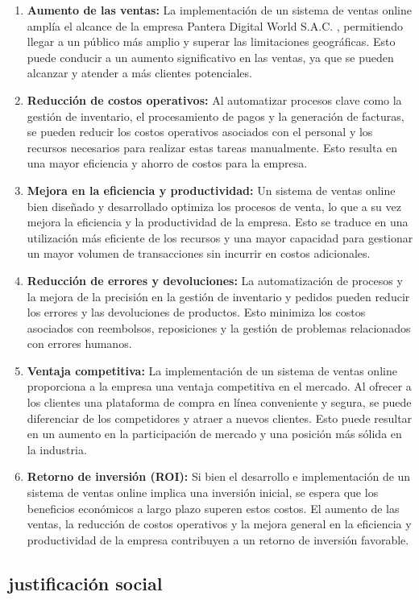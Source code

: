 \documentclass[12pt,a4paper]{article}
\newcommand{\newsubsection}[1]{\subsection{\hspace{5mm} #1}}
\newcommand{\empresa}{Pantera Digital World S.A.C. }
\begin{document}
\begin{enumerate}
\item \textbf{Aumento de las ventas:} La implementación de un sistema de ventas online amplía el alcance de la empresa \empresa, permitiendo llegar a un público más amplio y superar las limitaciones geográficas. Esto puede conducir a un aumento significativo en las ventas, ya que se pueden alcanzar y atender a más clientes potenciales.
\item \textbf{Reducción de costos operativos:} Al automatizar procesos clave como la gestión de inventario, el procesamiento de pagos y la generación de facturas, se pueden reducir los costos operativos asociados con el personal y los recursos necesarios para realizar estas tareas manualmente. Esto resulta en una mayor eficiencia y ahorro de costos para la empresa.
\item \textbf{Mejora en la eficiencia y productividad:} Un sistema de ventas online bien diseñado y desarrollado optimiza los procesos de venta, lo que a su vez mejora la eficiencia y la productividad de la empresa. Esto se traduce en una utilización más eficiente de los recursos y una mayor capacidad para gestionar un mayor volumen de transacciones sin incurrir en costos adicionales.
\item \textbf{Reducción de errores y devoluciones:} La automatización de procesos y la mejora de la precisión en la gestión de inventario y pedidos pueden reducir los errores y las devoluciones de productos. Esto minimiza los costos asociados con reembolsos, reposiciones y la gestión de problemas relacionados con errores humanos.
\item \textbf{Ventaja competitiva:} La implementación de un sistema de ventas online proporciona a la empresa una ventaja competitiva en el mercado. Al ofrecer a los clientes una plataforma de compra en línea conveniente y segura, se puede diferenciar de los competidores y atraer a nuevos clientes. Esto puede resultar en un aumento en la participación de mercado y una posición más sólida en la industria.
\item \textbf{Retorno de inversión (ROI):} Si bien el desarrollo e implementación de un sistema de ventas online implica una inversión inicial, se espera que los beneficios económicos a largo plazo superen estos costos. El aumento de las ventas, la reducción de costos operativos y la mejora general en la eficiencia y productividad de la empresa contribuyen a un retorno de inversión favorable.
\end{enumerate}
\newsubsection{justificación social}
\end{document}
